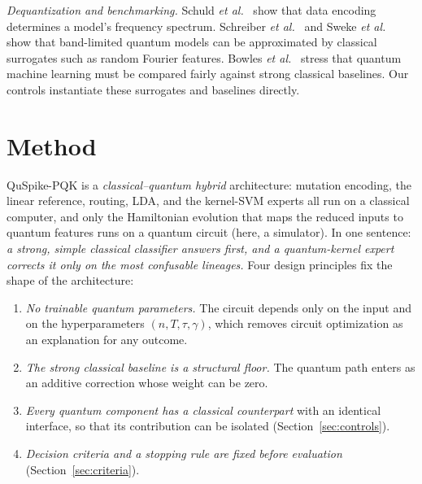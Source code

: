 \documentclass[conference]{IEEEtran}
\begin{document}
\textit{Dequantization and benchmarking.} Schuld \textit{et al.}~\cite{schuld2021effect} show that data encoding determines a model's frequency spectrum. Schreiber \textit{et al.}~\cite{schreiber2023surrogates} and Sweke \textit{et al.}~\cite{sweke2023rff} show that band-limited quantum models can be approximated by classical surrogates such as random Fourier features. Bowles \textit{et al.}~\cite{bowles2024better} stress that quantum machine learning must be compared fairly against strong classical baselines. Our controls instantiate these surrogates and baselines directly.

\section{Method}
\label{sec:method}

QuSpike-PQK is a \emph{classical--quantum hybrid} architecture: mutation encoding, the linear reference, routing, LDA, and the kernel-SVM experts all run on a classical computer, and only the Hamiltonian evolution that maps the reduced inputs to quantum features runs on a quantum circuit (here, a simulator). In one sentence: \emph{a strong, simple classical classifier answers first, and a quantum-kernel expert corrects it only on the most confusable lineages.} Four design principles fix the shape of the architecture:
\begin{enumerate}
    \item[P1)] \textit{No trainable quantum parameters.} The circuit depends only on the input and on the hyperparameters $(n,T,\tau,\gamma)$, which removes circuit optimization as an explanation for any outcome.
    \item[P2)] \textit{The strong classical baseline is a structural floor.} The quantum path enters as an additive correction whose weight can be zero.
    \item[P3)] \textit{Every quantum component has a classical counterpart} with an identical interface, so that its contribution can be isolated (Section~\ref{sec:controls}).
    \item[P4)] \textit{Decision criteria and a stopping rule are fixed before evaluation} (Section~\ref{sec:criteria}).
\end{enumerate}
\end{document}
